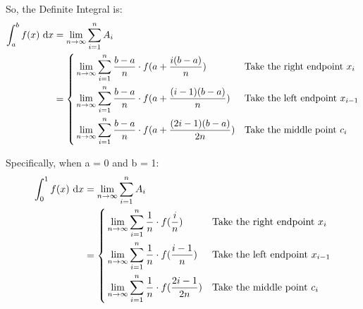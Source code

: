 \documentclass{article}
\begin{document}
	So, the Definite Integral is:
	\begin{align*}
		\int_{a}^{b} f(x) \d[x] & = \lim_{n \to \infty} \sum_{i=1}^{n} A_i
		\\
		& = \left\{\begin{aligned}
			& \lim_{n \to \infty} \sum_{i=1}^{n} \frac{b-a}{n} \cdot f(a +  \frac{i(b-a)}{n}) && \text{Take the right endpoint } x_i
			\\
			& \lim_{n \to \infty} \sum_{i=1}^{n} \frac{b-a}{n} \cdot f(a + \frac{(i - 1)(b - a)}{n}) && \text{Take the left endpoint } x_{i-1}
			\\
			& \lim_{n \to \infty} \sum_{i=1}^{n} \frac{b-a}{n} \cdot f(a + \frac{(2i - 1)(b - a)}{2n}) && \text{Take the middle point } c_i
		\end{aligned}\right.
		\\
	\end{align*}
	
	Specifically, when a = 0 and b = 1:
	\begin{align*}
		\int_{0}^{1} f(x) \d[x] & = \lim_{n \to \infty} \sum_{i=1}^{n} A_i
		\\
		& = \left\{\begin{aligned}
			& \lim_{n \to \infty} \sum_{i=1}^{n} \frac{1}{n} \cdot f(\frac{i}{n}) && \text{Take the right endpoint } x_i
			\\
			& \lim_{n \to \infty} \sum_{i=1}^{n} \frac{1}{n} \cdot f(\frac{i - 1}{n}) && \text{Take the left endpoint } x_{i-1}
			\\
			& \lim_{n \to \infty} \sum_{i=1}^{n} \frac{1}{n} \cdot f(\frac{2i - 1}{2n}) && \text{Take the middle point } c_i
		\end{aligned}\right.
	\end{align*}
\end{document}
